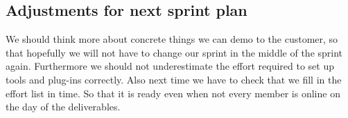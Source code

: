 \documentclass{scrartcl}
\begin{document}
\subsection{Adjustments for next sprint plan}
We should think more about concrete things we can demo to the customer, so that hopefully we will not have to change our sprint in the middle of the sprint again. Furthermore we should not underestimate the effort required to set up tools and plug-ins correctly. Also next time we have to check that we fill in the effort list in time. So that it is ready even when not every member is online on the day of the deliverables.
\end{document}
